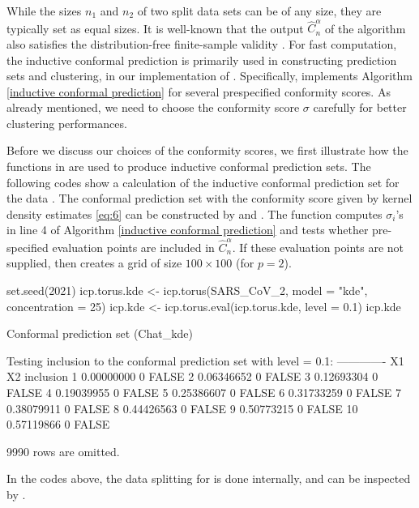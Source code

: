 While the sizes $n_1$ and $n_2$ of two split data sets can be of any size, they are typically set as equal sizes.
It is well-known that the output $\hat{C}^\alpha_n$ of the algorithm also satisfies the distribution-free finite-sample validity \citep{Vovk, Lei:2015}.  For fast computation, the inductive conformal prediction is primarily used in constructing prediction sets and clustering, in our implementation of . Specifically,  implements Algorithm \ref{inductive conformal prediction} for several prespecified conformity scores. As already mentioned, we need to choose the conformity score $\sigma$ carefully for better clustering performances.

Before we discuss our choices of the conformity scores, we first illustrate how the functions in  are used to produce inductive conformal prediction sets. The following codes show a calculation of the inductive conformal prediction set for the data . The conformal prediction set with the conformity score given by kernel density estimates \eqref{eq:6} can be constructed by  and . The function  computes $\sigma_i$'s in line 4 of Algorithm \ref{inductive conformal prediction} and  tests whether pre-specified evaluation points are included in $\hat{C}_n^\alpha$. If these evaluation points are not supplied, then  creates a grid of size $100 \times 100$ (for $p = 2$). %


\begin{example}
set.seed(2021)
icp.torus.kde <- icp.torus(SARS_CoV_2, model = "kde", concentration = 25)
icp.kde <- icp.torus.eval(icp.torus.kde, level = 0.1)
icp.kde

Conformal prediction set (Chat_kde)

Testing inclusion to the conformal prediction set with level = 0.1:
-------------
           X1 X2 inclusion
1  0.00000000  0     FALSE
2  0.06346652  0     FALSE
3  0.12693304  0     FALSE
4  0.19039955  0     FALSE
5  0.25386607  0     FALSE
6  0.31733259  0     FALSE
7  0.38079911  0     FALSE
8  0.44426563  0     FALSE
9  0.50773215  0     FALSE
10 0.57119866  0     FALSE

 9990 rows are omitted.
\end{example}

In the codes above, the data splitting for  is done internally, and can be inspected by
.

